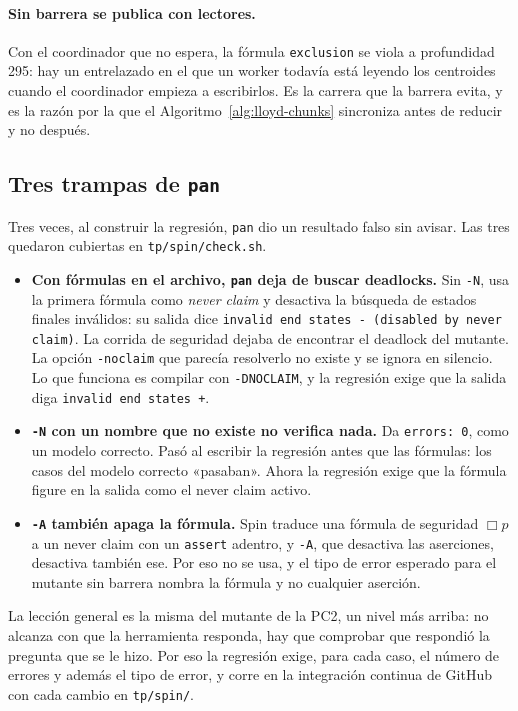 \paragraph{Sin barrera se publica con lectores.} Con el coordinador que no espera, la fórmula
\texttt{exclusion} se viola a profundidad 295: hay un entrelazado en el que un worker todavía está
leyendo los centroides cuando el coordinador empieza a escribirlos. Es la carrera que la barrera
evita, y es la razón por la que el Algoritmo~\ref{alg:lloyd-chunks} sincroniza antes de reducir y no
después.

\subsection{Tres trampas de \texttt{pan}}

Tres veces, al construir la regresión, \texttt{pan} dio un resultado falso sin avisar. Las tres
quedaron cubiertas en \texttt{tp/spin/check.sh}.

\begin{itemize}
  \item \textbf{Con fórmulas en el archivo, \texttt{pan} deja de buscar deadlocks.} Sin \texttt{-N},
        usa la primera fórmula como \emph{never claim} y desactiva la búsqueda de estados finales
        inválidos: su salida dice \texttt{invalid end states - (disabled by never claim)}. La corrida
        de seguridad dejaba de encontrar el deadlock del mutante. La opción \texttt{-noclaim} que
        parecía resolverlo no existe y se ignora en silencio. Lo que funciona es compilar con
        \texttt{-DNOCLAIM}, y la regresión exige que la salida diga \texttt{invalid end states +}.
  \item \textbf{\texttt{-N} con un nombre que no existe no verifica nada.} Da \texttt{errors: 0},
        como un modelo correcto. Pasó al escribir la regresión antes que las fórmulas: los casos del
        modelo correcto «pasaban». Ahora la regresión exige que la fórmula figure en la salida como
        el never claim activo.
  \item \textbf{\texttt{-A} también apaga la fórmula.} Spin traduce una fórmula de seguridad
        $\Box p$ a un never claim con un \texttt{assert} adentro, y \texttt{-A}, que desactiva las
        aserciones, desactiva también ese. Por eso no se usa, y el tipo de error esperado para el
        mutante sin barrera nombra la fórmula y no cualquier aserción.
\end{itemize}

La lección general es la misma del mutante de la PC2, un nivel más arriba: no alcanza con que la
herramienta responda, hay que comprobar que respondió la pregunta que se le hizo. Por eso la
regresión exige, para cada caso, el número de errores y además el tipo de error, y corre en la
integración continua de GitHub con cada cambio en \texttt{tp/spin/}.

